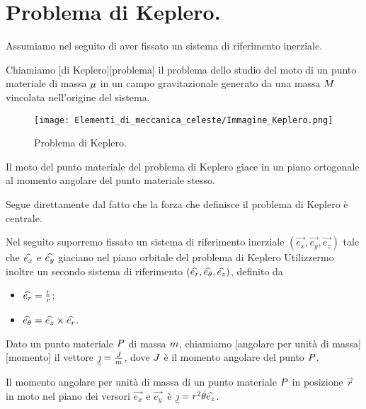 \section{Problema di Keplero.}
\label{ElementiDiMeccanicaCeleste_ProblemaDiKeplero}
Assumiamo nel seguito di aver fissato un sistema di riferimento inerziale.
\begin{Definition}
	Chiamiamo [di Keplero][problema] il problema dello studio del moto di un punto materiale di massa $\mu$ in un campo gravitazionale generato da una massa $M$ vincolata nell'origine del sistema.
\end{Definition}
\begin{figure}
	\texttt{[image: Elementi\_di\_meccanica\_celeste/Immagine\_Keplero.png]}
	\centering
	\caption{Problema di Keplero.}
\end{figure}
\begin{Theorem}
	Il moto del punto materiale del problema di Keplero giace in un piano ortogonale al momento angolare del punto materiale stesso.
\end{Theorem}
\Proof Segue direttamente dal fatto che la forza che definisce il problema di Keplero \`e centrale. \EndProof
\par Nel seguito suporremo fissato un sistema di riferimento inerziale $(\vec{e_x},\vec{e_y},\vec{e_z})$ tale che $\widehat{e_x}$ e $\widehat{e_y}$ giaciano nel piano orbitale del problema di Keplero Utilizzermo inoltre un secondo sistema di riferimento $(\widehat{e_r},\widehat{e_\theta},\widehat{e_z})$, definito da
\begin{itemize}
	\item $\widehat{e_r} = \frac{\underline{r}}{r}$;
	\item $\widehat{e_\theta} = \widehat{e_z} \times \widehat{e_r}$.
\end{itemize}
\begin{Definition}
	Dato un punto materiale $P$ di massa $m$, chiamiamo [angolare per unit\`a di massa][momento] il vettore $\underline{\jmath} = \frac{J}{m}$, dove $J$ \`e il momento angolare del punto $P$.
\end{Definition}
\begin{Theorem}
	Il momento angolare per unit\`a di massa di un punto materiale $P$ in posizione $\vec{r}$ in moto nel piano dei versori $\vec{e_x}$ e $\vec{e_y}$\ \`e $\underline{\jmath} = r^2\dot{\theta}\widehat{e_z}$.
\end{Theorem}
